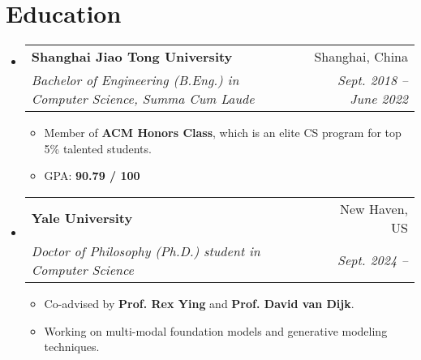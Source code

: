 \documentclass[letterpaper,11pt]{article}
\makeatletter
\newcommand{\resumeItem}[1]{
  \item\small{
    {#1 \vspace{-2pt}}
  }
}
\newcommand{\resumeSubheading}[4]{
  \vspace{-2pt}\item
    \begin{tabular*}{0.97\textwidth}[t]{l@{\extracolsep{\fill}}r}
      \textbf{#1} & #2 \\
      \textit{\small#3} & \textit{\small #4} \\
    \end{tabular*}\vspace{-5pt}
}
\newcommand{\resumeSubHeadingListStart}{\begin{itemize}[leftmargin=0.15in, label={}]}
\newcommand{\resumeSubHeadingListEnd}{\end{itemize}}
\newcommand{\resumeItemListStart}{\begin{itemize}[label={\color{itemcolor}•}]}
\newcommand{\resumeItemListEnd}{\end{itemize}\vspace{-5pt}}
\makeatother
\begin{document}
\section{Education}
  \resumeSubHeadingListStart
    \resumeSubheading
      {Shanghai Jiao Tong University}{Shanghai, China}
      {Bachelor of Engineering (B.Eng.) in Computer Science, \textit{Summa Cum Laude}}{Sept. 2018 -- June 2022}
      \resumeItemListStart
        \resumeItem{Member of \textbf{ACM Honors Class}, which is an elite CS program for top 5\% talented students.}
        \resumeItem{GPA: \textbf{90.79 / 100}
        }
      \resumeItemListEnd
    \resumeSubheading
      {Yale University}{New Haven, US}
      {Doctor of Philosophy (Ph.D.) student in Computer Science}{Sept. 2024 -- }
      \resumeItemListStart
        \resumeItem{Co-advised by \textbf{Prof. Rex Ying} and \textbf{Prof. David van Dijk}.}
        \resumeItem{Working on multi-modal foundation models and generative modeling techniques.}
      \resumeItemListEnd
  \resumeSubHeadingListEnd


\end{document}
